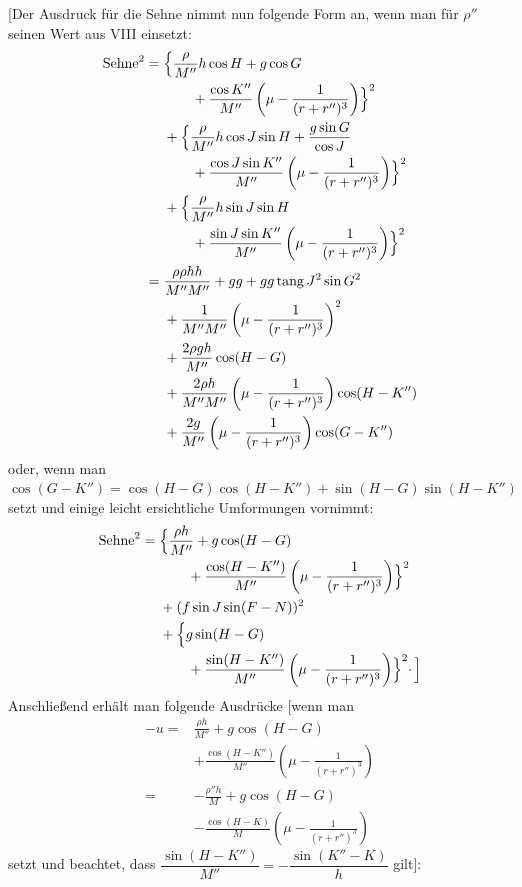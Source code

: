 [Der Ausdruck für die Sehne nimmt nun folgende Form an, wenn man für \(\rho''\) seinen Wert aus VIII einsetzt:
\[
\begin{aligned}
\text{Sehne}^2={}&\Bigl\{\frac{\rho}{M''}h\cos H+g\cos G\\
&\qquad{}+\frac{\cos K''}{M''}\left(\mu-\frac{1}{(r+r'')^3}\right)\Bigr\}^2\\
&+\Bigl\{\frac{\rho}{M''}h\cos J\sin H+\frac{g\sin G}{\cos J}\\
&\qquad{}+\frac{\cos J\sin K''}{M''}\left(\mu-\frac{1}{(r+r'')^3}\right)\Bigr\}^2\\
&+\Bigl\{\frac{\rho}{M''}h\sin J\sin H\\
&\qquad{}+\frac{\sin J\sin K''}{M''}\left(\mu-\frac{1}{(r+r'')^3}\right)\Bigr\}^2\\
={}&\frac{\rho\rho hh}{M''M''}+gg+gg\operatorname{tang}J^2\sin G^2\\
&+\frac{1}{M''M''}\left(\mu-\frac{1}{(r+r'')^3}\right)^2\\
&+\frac{2\rho gh}{M''}\cos(H-G)\\
&+\frac{2\rho h}{M''M''}\left(\mu-\frac{1}{(r+r'')^3}\right)\cos(H-K'')\\
&+\frac{2g}{M''}\left(\mu-\frac{1}{(r+r'')^3}\right)\cos(G-K'')
\end{aligned}
\]
oder, wenn man \(\cos(G-K'')=\cos(H-G)\cos(H-K'')+\sin(H-G)\sin(H-K'')\) setzt und einige leicht ersichtliche Umformungen vornimmt:
\[
\begin{aligned}
\text{Sehne}^2={}&\Bigl\{\frac{\rho h}{M''}+g\cos(H-G)\\
&\qquad{}+\frac{\cos(H-K'')}{M''}\left(\mu-\frac{1}{(r+r'')^3}\right)\Bigr\}^2\\
&+(f\sin J\sin(F-N))^2\\
&+\Bigl\{g\sin(H-G)\\
&\qquad{}+\frac{\sin(H-K'')}{M''}\left(\mu-\frac{1}{(r+r'')^3}\right)\Bigr\}^2\mathpunct{\cdot}\Bigr]
\end{aligned}
\]
Anschließend erhält man folgende Ausdrücke [wenn man
\[
\begin{aligned}
-u={}&\frac{\rho h}{M''}+g\cos(H-G)\\
&+\frac{\cos(H-K'')}{M''}\left(\mu-\frac{1}{(r+r'')^3}\right)\\
={}&-\frac{\rho''h}{M}+g\cos(H-G)\\
&-\frac{\cos(H-K)}{M}\left(\mu-\frac{1}{(r+r'')^3}\right)
\end{aligned}
\]
setzt und beachtet, dass \(\dfrac{\sin(H-K'')}{M''}=-\dfrac{\sin(K''-K)}{h}\) gilt]:
